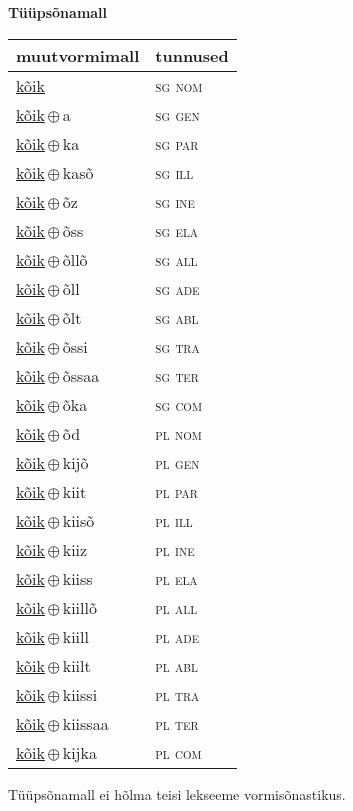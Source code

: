 

\vspace{3.5em}
\noindent \begin{minipage}{\textwidth}
\noindent \textbf{Tüüpsõnamall \,}\\

\begin{sideways}
\begin{tabular}{l l}
muutvormimall & tunnused \\
\hline
\underline{kõik} & \textsc{ sg nom } \\
\underline{kõik}\,$\oplus$\,a & \textsc{ sg gen } \\
\underline{kõik}\,$\oplus$\,ka & \textsc{ sg par } \\
\underline{kõik}\,$\oplus$\,kasõ & \textsc{ sg ill } \\
\underline{kõik}\,$\oplus$\,õz & \textsc{ sg ine } \\
\underline{kõik}\,$\oplus$\,õss & \textsc{ sg ela } \\
\underline{kõik}\,$\oplus$\,õllõ & \textsc{ sg all } \\
\underline{kõik}\,$\oplus$\,õll & \textsc{ sg ade } \\
\underline{kõik}\,$\oplus$\,õlt & \textsc{ sg abl } \\
\underline{kõik}\,$\oplus$\,õssi & \textsc{ sg tra } \\
\underline{kõik}\,$\oplus$\,õssaa & \textsc{ sg ter } \\
\underline{kõik}\,$\oplus$\,õka & \textsc{ sg com } \\
\underline{kõik}\,$\oplus$\,õd & \textsc{ pl nom } \\
\underline{kõik}\,$\oplus$\,kijõ & \textsc{ pl gen } \\
\underline{kõik}\,$\oplus$\,kiit & \textsc{ pl par } \\
\underline{kõik}\,$\oplus$\,kiisõ & \textsc{ pl ill } \\
\underline{kõik}\,$\oplus$\,kiiz & \textsc{ pl ine } \\
\underline{kõik}\,$\oplus$\,kiiss & \textsc{ pl ela } \\
\underline{kõik}\,$\oplus$\,kiillõ & \textsc{ pl all } \\
\underline{kõik}\,$\oplus$\,kiill & \textsc{ pl ade } \\
\underline{kõik}\,$\oplus$\,kiilt & \textsc{ pl abl } \\
\underline{kõik}\,$\oplus$\,kiissi & \textsc{ pl tra } \\
\underline{kõik}\,$\oplus$\,kiissaa & \textsc{ pl ter } \\
\underline{kõik}\,$\oplus$\,kijka & \textsc{ pl com } \\
\end{tabular}
\end{sideways}
\label{tab:tüüpsõnamall-kõik}

\end{minipage}

 
\vspace{1em}
\noindent Tüüpsõnamall  ei hõlma teisi lekseeme vormi\-sõnastikus.
